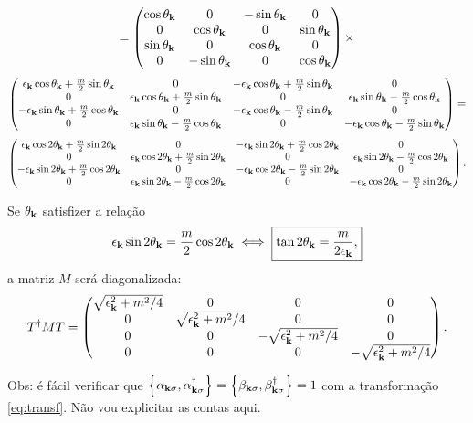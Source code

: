 \documentclass[a4paper,10pt]{article}
\begin{document}
$$
=
\begin{pmatrix}
\cos\theta_{\vb{k}} & 0 & -\sin\theta_{\vb{k}} & 0 \\
0 & \cos\theta_{\vb{k}} & 0 & \sin\theta_{\vb{k}} \\
\sin\theta_{\vb{k}} & 0 & \cos\theta_{\vb{k}} & 0 \\
0 & -\sin\theta_{\vb{k}} & 0 & \cos\theta_{\vb{k}}
\end{pmatrix}
\times
$$
$$
\begin{pmatrix}
\epsilon_{\vb{k}}\cos\theta_{\vb{k}} + \frac{m}{2}\sin\theta_{\vb{k}} & 0 & -\epsilon_{\vb{k}}\cos\theta_{\vb{k}}+\frac{m}{2}\sin\theta_{\vb{k}} & 0 \\
0 & \epsilon_{\vb{k}}\cos\theta_{\vb{k}}+\frac{m}{2}\sin\theta_{\vb{k}} & 0 & \epsilon_{\vb{k}}\sin\theta_{\vb{k}}-\frac{m}{2}\cos\theta_{\vb{k}} \\
-\epsilon_{\vb{k}}\sin\theta_{\vb{k}}+\frac{m}{2}\cos\theta_{\vb{k}} & 0 & -\epsilon_{\vb{k}}\cos\theta_{\vb{k}}-\frac{m}{2}\sin\theta_{\vb{k}} & 0 \\
0 & \epsilon_{\vb{k}}\sin\theta_{\vb{k}}-\frac{m}{2}\cos\theta_{\vb{k}} & 0 & -\epsilon_{\vb{k}}\cos\theta_{\vb{k}}-\frac{m}{2}\sin\theta_{\vb{k}}
\end{pmatrix} =
$$
$$
\begin{pmatrix}
\epsilon_{\vb{k}}\cos2\theta_{\vb{k}} + \frac{m}{2}\sin2\theta_{\vb{k}} & 0 & -\epsilon_{\vb{k}}\sin2\theta_{\vb{k}}+\frac{m}{2}\cos2\theta_{\vb{k}} & 0 \\
0 & \epsilon_{\vb{k}}\cos2\theta_{\vb{k}}+\frac{m}{2}\sin2\theta_{\vb{k}} & 0 & \epsilon_{\vb{k}}\sin2\theta_{\vb{k}}-\frac{m}{2}\cos2\theta_{\vb{k}} \\
-\epsilon_{\vb{k}}\sin2\theta_{\vb{k}}+\frac{m}{2}\cos2\theta_{\vb{k}} & 0 & -\epsilon_{\vb{k}}\cos2\theta_{\vb{k}}-\frac{m}{2}\sin2\theta_{\vb{k}} & 0 \\
0 & \epsilon_{\vb{k}}\sin2\theta_{\vb{k}}-\frac{m}{2}\cos2\theta_{\vb{k}} & 0 & -\epsilon_{\vb{k}}\cos2\theta_{\vb{k}}-\frac{m}{2}\sin2\theta_{\vb{k}}
\end{pmatrix}.
$$

\n

Se $\theta_{\vb{k}}$ satisfizer a relação
$$
\epsilon_{\vb{k}} \sin2\theta_{\vb{k}} = \frac{m}{2} \cos2\theta_{\vb{k}} \iff
\boxed{ \tan2\theta_{\vb{k}} = \frac{m}{2\epsilon_{\vb{k}}}, }
$$
a matriz $M$ será diagonalizada:
$$
T^\dagger M T =
\begin{pmatrix}
\sqrt{\epsilon_{\vb{k}}^2 + m^2/4} & 0 & 0 & 0 \\
0 & \sqrt{\epsilon_{\vb{k}}^2 + m^2/4} & 0 & 0 \\
0 & 0 & -\sqrt{\epsilon_{\vb{k}}^2 + m^2/4} & 0 \\
0 & 0 & 0 & -\sqrt{\epsilon_{\vb{k}}^2 + m^2/4}
\end{pmatrix}.
$$

Obs: é fácil verificar que $\qty{\alpha_{\vb{k}\sigma},\alpha_{\vb{k}\sigma}^\dagger} = \qty{\beta_{\vb{k}\sigma},\beta_{\vb{k}\sigma}^\dagger} = 1$ com a transformação \ref{eq:transf}. Não vou explicitar as contas aqui.
\end{document}
